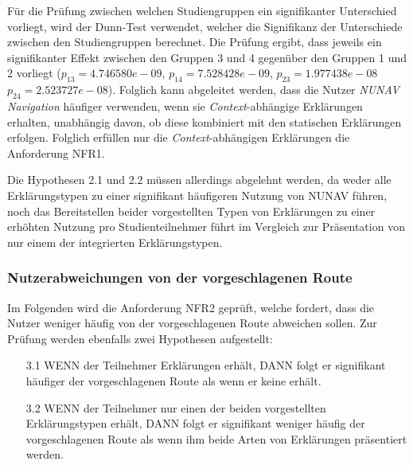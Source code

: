 Für die Prüfung zwischen welchen Studiengruppen ein signifikanter Unterschied vorliegt, wird der Dunn-Test \cite{dunn1964multiple} verwendet, welcher die Signifikanz der Unterschiede zwischen den Studiengruppen berechnet. Die Prüfung ergibt, dass jeweils ein signifikanter Effekt zwischen den Gruppen 3 und 4 gegenüber den Gruppen 1 und 2 vorliegt ($ p_{13} = 4.746580e-09 $, $ p_{14} = 7.528428e-09 $, $ p_{23} = 1.977438e-08 $ $ p_{24} = 2.523727e-08 $). Folglich kann abgeleitet werden, dass die Nutzer \textit{NUNAV Navigation} häufiger verwenden, wenn sie \textit{Context}-abhängige Erklärungen erhalten, unabhängig davon, ob diese kombiniert mit den statischen Erklärungen erfolgen. Folglich erfüllen nur die \textit{Context}-abhängigen Erklärungen die Anforderung NFR1.

Die Hypothesen 2.1 und 2.2 müssen allerdings abgelehnt werden, da weder alle Erklärungstypen zu einer signifikant häufigeren Nutzung von NUNAV führen, noch das Bereitstellen beider vorgestellten Typen von Erklärungen zu einer erhöhten Nutzung pro Studienteilnehmer führt im Vergleich zur Präsentation von nur einem der integrierten Erklärungstypen. 

\subsubsection{Nutzerabweichungen von der vorgeschlagenen Route}

Im Folgenden wird die Anforderung NFR2 geprüft, welche fordert, dass die Nutzer weniger häufig von der vorgeschlagenen Route abweichen sollen. Zur Prüfung werden ebenfalls zwei Hypothesen aufgestellt:

\begin{enumerate}
    \item[3.1] WENN der Teilnehmer Erklärungen erhält, DANN folgt er signifikant häufiger der vorgeschlagenen Route als wenn er keine erhält.
    \item[3.2] WENN der Teilnehmer nur einen der beiden vorgestellten Erklärungstypen erhält, DANN folgt er signifikant weniger häufig der vorgeschlagenen Route als wenn ihm beide Arten von Erklärungen präsentiert werden.
\end{enumerate}

